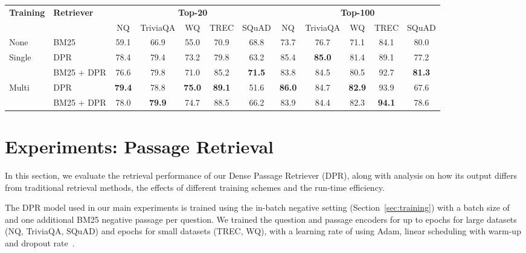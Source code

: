 \documentclass[11pt,a4paper]{article}
\def\model/{DPR}
\newcommand\ti[1]{\textit{#1}}
\newcommand\tf[1]{\textbf{#1}}
\begin{document}
\begin{table*}[t!]
    \setlength\tabcolsep{5pt}
    \centering
    \small
    \begin{tabular}{ll|ccccc|ccccc}
    \toprule
    \tf{Training} & \tf{Retriever} & \multicolumn{5}{c}{\tf{Top-20}} & \multicolumn{5}{|c}{\tf{Top-100}} \\
    & & NQ & TriviaQA & WQ & TREC & SQuAD & NQ & TriviaQA & WQ & TREC & SQuAD \\ \midrule
    None & BM25 & 59.1 & 66.9 & 55.0 & 70.9 & 68.8 & 73.7 & 76.7 & 71.1 & 84.1 & 80.0 \\
    \midrule
    \multirow{2}{*}{Single} &\model/ & 78.4 & 79.4 & 73.2 & 79.8 & 63.2 & 85.4 & \textbf{85.0} & 81.4 & 89.1 & 77.2 \\
    &BM25 + \model/ & 76.6 & 79.8 & 71.0 & 85.2 & \textbf{71.5} & 83.8 & 84.5 & 80.5 & 92.7 & \textbf{81.3} \\
    \midrule
    \multirow{2}{*}{Multi} &\model/ & \textbf{79.4} & 78.8 & \textbf{75.0} & \textbf{89.1} & 51.6 & \textbf{86.0} & 84.7 & \textbf{82.9} & 93.9 & 67.6 \\
    &BM25 + \model/ & 78.0 & \textbf{79.9} & 74.7 & 88.5 & 66.2 & 83.9 & 84.4 & 82.3 & \textbf{94.1} & 78.6 \\ \bottomrule
    \end{tabular}
     \caption{Top-20 \& Top-100 retrieval accuracy on test sets, measured as the percentage of top 20/100 retrieved passages that contain the answer. \ti{Single} and \ti{Multi} denote that our Dense Passage Retriever (DPR) was trained using individial or combined training datasets (all the datasets excluding SQuAD). See text for more details.} 

    \label{tab:qa_ir}
\end{table*}


 
\section{Experiments: Passage Retrieval}
\label{sec:exp-psg}

In this section, we evaluate the retrieval performance of our Dense Passage Retriever (\model/), along with analysis on
how its output differs from traditional retrieval methods, the effects of different training schemes and the run-time efficiency.

The \model/ model used in our main experiments is trained using the in-batch negative setting (Section~\ref{sec:training}) with a batch size of  and one additional BM25 negative passage per question.
We trained the question and passage encoders for up to  epochs for large datasets (NQ, TriviaQA, SQuAD) and  epochs for small datasets (TREC, WQ), with a learning rate of  using Adam, linear scheduling with warm-up and dropout rate~.
\end{document}
